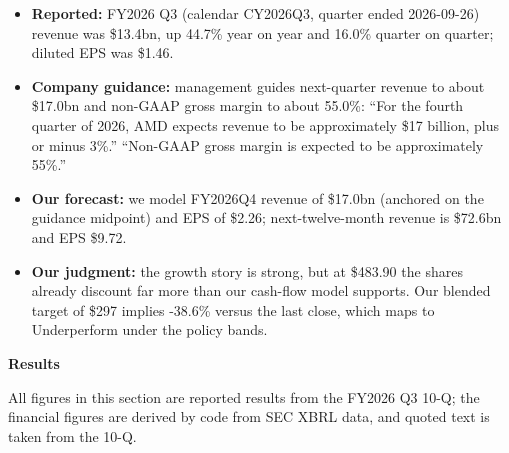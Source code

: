 \documentclass[a4paper,10pt]{article}
\begin{document}
\begin{itemize}\setlength{\itemsep}{1pt}
\item \textbf{Reported:} FY2026 Q3 (calendar CY2026Q3, quarter ended 2026-09-26) revenue was \$13.4bn, up 44.7\% year on year and 16.0\% quarter on quarter; diluted EPS was \$1.46.
\item \textbf{Company guidance:} management guides next-quarter revenue to about \$17.0bn and non-GAAP gross margin to about 55.0\%: “For the fourth quarter of 2026, AMD expects revenue to be approximately \$17 billion, plus or minus 3\%.” “Non-GAAP gross margin is expected to be approximately 55\%.”
\item \textbf{Our forecast:} we model FY2026Q4 revenue of \$17.0bn (anchored on the guidance midpoint) and EPS of \$2.26; next-twelve-month revenue is \$72.6bn and EPS \$9.72.
\item \textbf{Our judgment:} the growth story is strong, but at \$483.90 the shares already discount far more than our cash-flow model supports. Our blended target of \$297 implies -38.6\% versus the last close, which maps to Underperform under the policy bands.
\end{itemize}

\par\smallskip\textbf{\color{MemoBlue}Results}\par

All figures in this section are reported results from the FY2026 Q3 10-Q; the financial figures are derived by code from SEC XBRL data, and quoted text is taken from the 10-Q.
\end{document}

